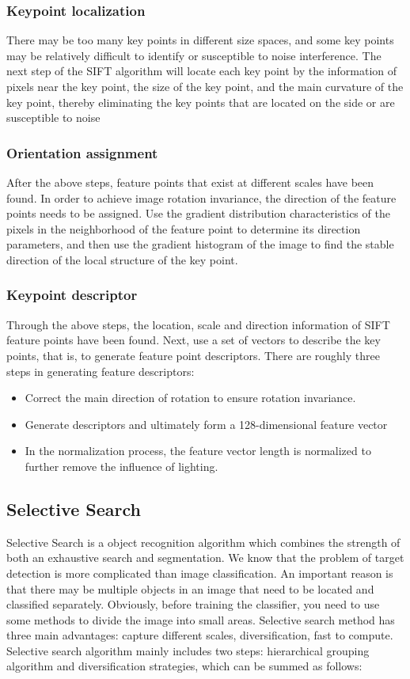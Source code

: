 \documentclass[conference]{IEEEtran}
\begin{document}
\subsubsection{Keypoint localization}
There may be too many key points in different size spaces, and some key points may be relatively difficult to identify or susceptible to noise interference. The next step of the SIFT algorithm will locate each key point by the information of pixels near the key point, the size of the key point, and the main curvature of the key point, thereby eliminating the key points that are located on the side or are susceptible to noise
\subsubsection{Orientation assignment}
After the above steps, feature points that exist at different scales have been found. In order to achieve image rotation invariance, the direction of the feature points needs to be assigned. Use the gradient distribution characteristics of the pixels in the neighborhood of the feature point to determine its direction parameters, and then use the gradient histogram of the image to find the stable direction of the local structure of the key point.
\subsubsection{Keypoint descriptor}
Through the above steps, the location, scale and direction information of SIFT feature points have been found. Next, use a set of vectors to describe the key points, that is, to generate feature point descriptors. There are roughly three steps in generating feature descriptors:
\begin{itemize}
\item Correct the main direction of rotation to ensure rotation invariance.
\item Generate descriptors and ultimately form a 128-dimensional feature vector
\item In the normalization process, the feature vector length is normalized to further remove the influence of lighting.
\end{itemize}

\subsection{Selective Search}

Selective Search is a object recognition algorithm which combines the strength of both an exhaustive search and segmentation.\cite{2013Selective} We know that the problem of target detection is more complicated than image classification. An important reason is that there may be multiple objects in an image that need to be located and classified separately. Obviously, before training the classifier, you need to use some methods to divide the image into small areas. Selective search method has three main advantages: capture different scales, diversification, fast to compute. Selective search algorithm mainly includes two steps: hierarchical grouping algorithm and diversification strategies, which can be summed as follows:
\end{document}
